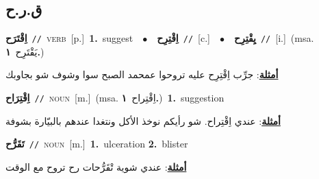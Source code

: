 \documentclass[10pt,a4paper,twoside]{article} %
\begin{document}
\begin{multicols}{2}
\vspace{-3mm}
\subsection*{\color{blue}\foreignlanguage{arabic}{ق.ر.ح}\color{blue}{}} 

{\setlength\topsep{0pt}\textbf{\foreignlanguage{arabic}{اِقْتَرَح}}\ {\color{gray}\texttt{//}\color{black}}\ \textsc{verb}\ [p.]\ \textbf{1.}~suggest\ \ $\bullet$\ \ \setlength\topsep{0pt}\textbf{\foreignlanguage{arabic}{اِقْتِرِح}}\ {\color{gray}\texttt{//}\color{black}}\ [c.]\ \ $\bullet$\ \ \setlength\topsep{0pt}\textbf{\foreignlanguage{arabic}{يِقْتِرِح}}\ {\color{gray}\texttt{//}\color{black}}\ [i.]\ \color{gray}(msa. \foreignlanguage{arabic}{يَقْتَرِح}~\foreignlanguage{arabic}{\textbf{١.}})\color{black}\  \begin{flushright}\color{gray}\foreignlanguage{arabic}{\textbf{\underline{\foreignlanguage{arabic}{أمثلة}}}: جرِّب اِقْتِرِح عليه تروحوا عمحمد الصبح سوا وشوف شو بجاوبك}\end{flushright}\color{black}} \vspace{2mm}

{\setlength\topsep{0pt}\textbf{\foreignlanguage{arabic}{اِقْتِرَاح}}\ {\color{gray}\texttt{//}\color{black}}\ \textsc{noun}\ [m.]\ \color{gray}(msa. \foreignlanguage{arabic}{اِقْتِراح}~\foreignlanguage{arabic}{\textbf{١.}})\color{black}\ \textbf{1.}~suggestion\  \begin{flushright}\color{gray}\foreignlanguage{arabic}{\textbf{\underline{\foreignlanguage{arabic}{أمثلة}}}: عندي اِقْتِراح. شو رأيكم نوخذ الأكل ونتغدا عندهم بالبيّارة بشوفة}\end{flushright}\color{black}} \vspace{2mm}

{\setlength\topsep{0pt}\textbf{\foreignlanguage{arabic}{تَقَرُّح}}\ {\color{gray}\texttt{//}\color{black}}\ \textsc{noun}\ [m.]\ \textbf{1.}~ulceration  \textbf{2.}~blister\  \begin{flushright}\color{gray}\foreignlanguage{arabic}{\textbf{\underline{\foreignlanguage{arabic}{أمثلة}}}: عندي شوية تْقَرُّحات رح تروح مع الوقت}\end{flushright}\color{black}} \vspace{2mm}


\end{multicols}
\end{document}
